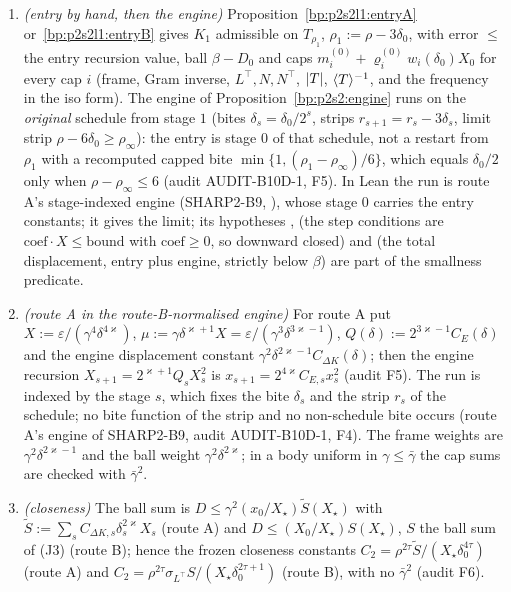 \begin{proposition}\label{bp:p2s2l1:engine}
\begin{enumerate}[label=(\alph*)]
\item \emph{(entry by hand, then the engine)} Proposition~\ref{bp:p2s2l1:entryA} or~\ref{bp:p2s2l1:entryB} gives $K_1$ admissible on $T_{\rho_1}$, $\rho_1:=\rho-3\delta_0$,
  with error $\le$ the entry recursion value, ball $\beta-D_0$ and caps $m^{(0)}_i+\varrho^{(0)}_iw_i(\delta_0)X_0$ for every cap $i$ (frame, Gram inverse,
  $L^\top,N,N^\top$, $\lvert T\rvert$, $\langle T\rangle^{-1}$, and the frequency in the iso form). The engine of Proposition~\ref{bp:p2s2:engine} runs on the
  \emph{original} schedule from stage $1$ (bites $\delta_s=\delta_0/2^s$, strips $r_{s+1}=r_s-3\delta_s$, limit strip $\rho-6\delta_0\ge\rho_\infty$): the entry is
  stage $0$ of that schedule, not a restart from $\rho_1$ with a recomputed capped bite $\min\{1,(\rho_1-\rho_\infty)/6\}$, which equals $\delta_0/2$ only when
  $\rho-\rho_\infty\le6$ (audit AUDIT-B10D-1, F5). In Lean the run is route A's stage-indexed engine (SHARP2-B9, ),
  whose stage $0$ carries the entry constants; it gives the limit; its hypotheses ,  (the step conditions are $\mathrm{coef}\cdot X\le\mathrm{bound}$ with $\mathrm{coef}\ge0$, so
  downward closed) and  (the total displacement, entry plus engine, strictly below $\beta$) are part of the smallness predicate.
\item \emph{(route A in the route-B-normalised engine)} For route A put $X:=\varepsilon/(\gamma^4\delta^{4\varkappa})$, $\mu:=\gamma\delta^{\varkappa+1}X=\varepsilon/(\gamma^3\delta^{3\varkappa-1})$,
  $Q(\delta):=2^{3\varkappa-1}C_E(\delta)$ and the engine displacement constant $\gamma^2\delta^{2\varkappa-1}C_{\Delta K}(\delta)$; then the engine recursion
  $X_{s+1}=2^{\varkappa+1}Q_sX_s^2$ is $x_{s+1}=2^{4\varkappa}C_{E,s}x_s^2$ (audit F5). The run is indexed by the stage $s$, which fixes the bite $\delta_s$
  and the strip $r_s$ of the schedule; no bite function of the strip and no non-schedule bite occurs (route A's engine of SHARP2-B9, audit
  AUDIT-B10D-1, F4). The frame weights are $\gamma^2\delta^{2\varkappa-1}$ and the ball weight $\gamma^2\delta^{2\varkappa}$; in a body uniform in
  $\gamma\le\bar\gamma$ the cap sums are checked with $\bar\gamma^2$.
\item \emph{(closeness)} The ball sum is $D\le\gamma^2(x_0/X_\star)\tilde S(X_\star)$ with $\tilde S:=\sum_sC_{\Delta K,s}\delta_s^{2\varkappa}X_s$ (route A) and
  $D\le(X_0/X_\star)S(X_\star)$, $S$ the ball sum of (J3) (route B); hence the frozen closeness constants $C_2=\rho^{2\tau}\tilde S/(X_\star\delta_0^{4\tau})$ (route A) and
  $C_2=\rho^{2\tau}\sigma_{L^\top}S/(X_\star\delta_0^{2\tau+1})$ (route B), with no $\bar\gamma^2$ (audit F6).
\end{enumerate}
\end{proposition}

